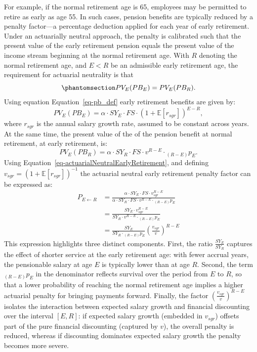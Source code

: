 \documentclass[
  letterpaper,
  DIV=11,
  numbers=noendperiod]{scrreprt}
\begin{document}
For example, if the normal retirement age is 65, employees may be
permitted to retire as early as age 55. In such cases, pension benefits
are typically reduced by a penalty factor---a percentage deduction
applied for each year of early retirement. Under an actuarially neutral
approach, the penalty is calibrated such that the present value of the
early retirement pension equals the present value of the income stream
beginning at the normal retirement age. With \(R\) denoting the normal
retirement age, and \(E<R\) be an admissible early retirement age, the
requirement for actuarial neutrality is that
\begin{equation}\protect\phantomsection\label{eq-actuarialNeutralEarlyRetirement}{
    PV_E(PB_E) = PV_E(PB_R).
}\end{equation} Using equation Equation~\ref{eq-pb_def} early retirement
benefits are given by: \[
   PV_E(PB_E) = \alpha \cdot SY_E \cdot FS \cdot (1+\mathbb{E}\left[r_{sgr}\right])^{E-R},
\] where \(r_{sgr}\) is the annual salary growth rate, assumed to be
constant across years. At the same time, the present value of the of the
pension benefit at normal retirement, at early retirement, is: \[
    PV_E(PB_R) = \alpha \cdot SY_R \cdot FS \cdot v^{R-E} \cdot {}_{(R-E)}p_E.
\] Using Equation~\ref{eq-actuarialNeutralEarlyRetirement}, and defining
\(v_{sgr}=(1+\mathbb{E}\left[r_{sgr}\right])^{-1}\) the actuarial
neutral early retirement penalty factor can be expressed as: \[
\begin{aligned}
    P_{E\leftarrow R} &= \frac{\alpha \cdot SY_E \cdot FS \cdot v_{sgr}^{R-E}}{\alpha \cdot SY_R \cdot FS \cdot v^{R-E} \cdot {}_{(R-E)}p_E} \nonumber \\ 
    &= \frac{ SY_E \cdot v_{sgr}^{R-E}}{SY_R \cdot v^{R-E} \cdot {}_{(R-E)}p_E} \nonumber \\
    &= \frac{SY_E}{SY_R \cdot {}_{(R-E)}p_E} \left( \frac{v_{sgr}}{v} \right)^{R-E}
\end{aligned}
\] This expression highlights three distinct components. First, the
ratio \(\frac{SY_E}{SY_R}\) captures the effect of shorter service at
the early retirement age: with fewer accrual years, the pensionable
salary at age \(E\) is typically lower than at age \(R\). Second, the
term \({}_{(R-E)}p_E\) in the denominator reflects survival over the
period from \(E\) to \(R\), so that a lower probability of reaching the
normal retirement age implies a higher actuarial penalty for bringing
payments forward. Finally, the factor
\(\left(\frac{v_{sgr}}{v}\right)^{R-E}\) isolates the interaction
between expected salary growth and financial discounting over the
interval \([E,R]\): if expected salary growth (embedded in \(v_{sgr}\))
offsets part of the pure financial discounting (captured by \(v\)), the
overall penalty is reduced, whereas if discounting dominates expected
salary growth the penalty becomes more severe.
\end{document}
